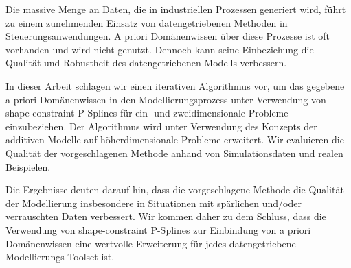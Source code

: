 
Die massive Menge an Daten, die in industriellen Prozessen generiert wird, f\"uhrt zu einem zunehmenden Einsatz von datengetriebenen Methoden in Steuerungsanwendungen. A priori Dom\"anenwissen \"uber diese Prozesse ist oft vorhanden und wird nicht genutzt. Dennoch kann seine Einbeziehung die Qualit\"at und Robustheit des datengetriebenen Modells verbessern. 

In dieser Arbeit schlagen wir einen iterativen Algorithmus vor, um das gegebene a priori Dom\"anenwissen in den Modellierungsprozess unter Verwendung von shape-constraint P-Splines f\"ur ein- und zweidimensionale Probleme einzubeziehen. Der Algorithmus wird unter Verwendung des Konzepts der additiven Modelle auf h\"oherdimensionale Probleme erweitert. Wir evaluieren die Qualit\"at der vorgeschlagenen Methode anhand von Simulationsdaten und realen Beispielen.

Die Ergebnisse deuten darauf hin, dass die vorgeschlagene Methode die Qualit\"at der Modellierung insbesondere in Situationen mit sp\"arlichen und/oder verrauschten Daten verbessert. Wir kommen daher zu dem Schluss, dass die Verwendung von shape-constraint P-Splines zur Einbindung von a priori Dom\"anenwissen eine wertvolle Erweiterung f\"ur jedes datengetriebene Modellierungs-Toolset ist.

